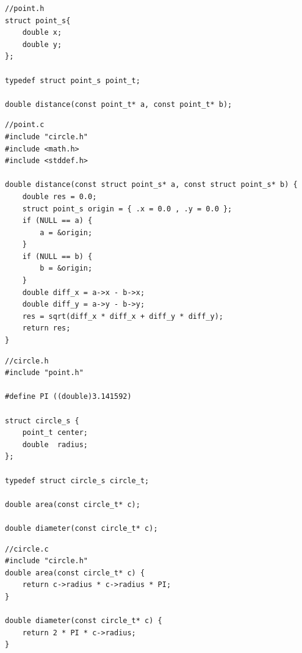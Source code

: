 \documentclass[a4paper]{article}
\begin{document}
\noindent
\begin{minipage}[H]{\linewidth}
\mbox{}
\begin{lstlisting}[style=C,
caption={Redefinition example -- \texttt{point.h}},
label={lst:redefInclude}]
//point.h
struct point_s{
    double x;
    double y;
};

typedef struct point_s point_t;

double distance(const point_t* a, const point_t* b);
\end{lstlisting}
\end{minipage}
\noindent
\begin{minipage}[H]{\linewidth}
\mbox{}
\begin{lstlisting}[style=C,
caption={Redefinition example -- \texttt{point.c}},
label={lst:redefInclude}]
//point.c
#include "circle.h"
#include <math.h>
#include <stddef.h>

double distance(const struct point_s* a, const struct point_s* b) {
    double res = 0.0;
    struct point_s origin = { .x = 0.0 , .y = 0.0 };
    if (NULL == a) {
        a = &origin;
    }
    if (NULL == b) {
        b = &origin;
    }
    double diff_x = a->x - b->x;
    double diff_y = a->y - b->y;
    res = sqrt(diff_x * diff_x + diff_y * diff_y);
    return res;
}
\end{lstlisting}
\end{minipage}
\noindent
\begin{minipage}[H]{\linewidth}
\mbox{}
\begin{lstlisting}[style=C,
caption={Redefinition example -- \texttt{circle.h}},
label={lst:redefInclude}]
//circle.h
#include "point.h"

#define PI ((double)3.141592)

struct circle_s {
    point_t center;
    double  radius;
};

typedef struct circle_s circle_t;

double area(const circle_t* c);

double diameter(const circle_t* c);
\end{lstlisting}
\end{minipage}

\noindent
\begin{minipage}[H]{\linewidth}
\mbox{}
\begin{lstlisting}[style=C,
caption={Redefinition example -- \texttt{circle.c}},
label={lst:redefInclude}]
//circle.c
#include "circle.h"
double area(const circle_t* c) {
    return c->radius * c->radius * PI;
}

double diameter(const circle_t* c) {
    return 2 * PI * c->radius;
}
\end{lstlisting}
\end{minipage}
\end{document}
